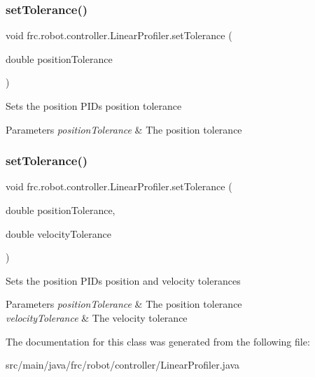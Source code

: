 \subsubsection{\texorpdfstring{setTolerance()}{setTolerance()}\hspace{0.1cm}{\footnotesize\ttfamily [1/2]}}
{\footnotesize\ttfamily void frc.\+robot.\+controller.\+Linear\+Profiler.\+set\+Tolerance (\begin{DoxyParamCaption}\item[{double}]{position\+Tolerance }\end{DoxyParamCaption})\hspace{0.3cm}{\ttfamily [inline]}}

Sets the position P\+ID\textquotesingle{}s position tolerance


\begin{DoxyParams}{Parameters}
{\em position\+Tolerance} & The position tolerance \\
\hline
\end{DoxyParams}
\mbox{\label{classfrc_1_1robot_1_1controller_1_1_linear_profiler_ad7b7203deb6b79d10de0f50c1822f68d}} 
\subsubsection{\texorpdfstring{setTolerance()}{setTolerance()}\hspace{0.1cm}{\footnotesize\ttfamily [2/2]}}
{\footnotesize\ttfamily void frc.\+robot.\+controller.\+Linear\+Profiler.\+set\+Tolerance (\begin{DoxyParamCaption}\item[{double}]{position\+Tolerance,  }\item[{double}]{velocity\+Tolerance }\end{DoxyParamCaption})\hspace{0.3cm}{\ttfamily [inline]}}

Sets the position P\+ID\textquotesingle{}s position and velocity tolerances


\begin{DoxyParams}{Parameters}
{\em position\+Tolerance} & The position tolerance \\
\hline
{\em velocity\+Tolerance} & The velocity tolerance \\
\hline
\end{DoxyParams}


The documentation for this class was generated from the following file\+:\begin{DoxyCompactItemize}
\item 
src/main/java/frc/robot/controller/Linear\+Profiler.\+java\end{DoxyCompactItemize}

